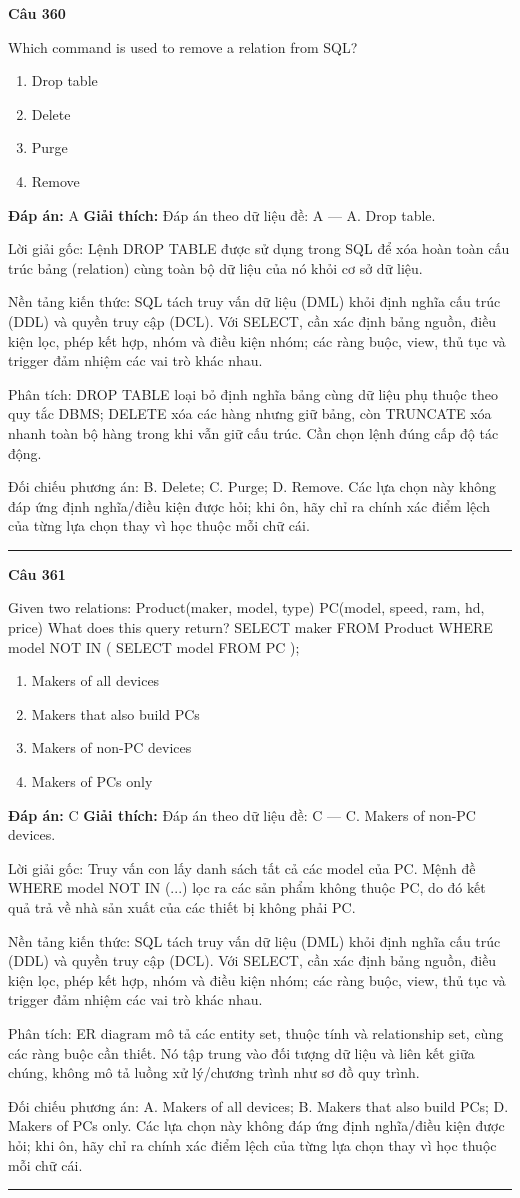 \documentclass[11pt,a4paper]{article}
\newenvironment{question}[1]{%
  \par\vspace{1em}\noindent\textbf{\large Câu #1}\par\vspace{0.4em}
}{%
  \par\vspace{1em}\hrule\vspace{0.6em}
}
\newenvironment{choices}{%
  \begin{enumerate}[label=\textbf{\Alph*.},leftmargin=2.2em,itemsep=2pt,topsep=3pt]
}{%
  \end{enumerate}
}
\newcommand{\choice}{\item}
\begin{document}
\begin{question}{360}
Which command is used to remove a relation from SQL?
\begin{choices}
\choice Drop table
\choice Delete
\choice Purge
\choice Remove
\end{choices}
\textbf{Đáp án:} A
\textbf{Giải thích:} Đáp án theo dữ liệu đề: A — A. Drop table.

Lời giải gốc: Lệnh DROP TABLE được sử dụng trong SQL để xóa hoàn toàn cấu trúc bảng (relation) cùng toàn bộ dữ liệu của nó khỏi cơ sở dữ liệu.

Nền tảng kiến thức: SQL tách truy vấn dữ liệu (DML) khỏi định nghĩa cấu trúc (DDL) và quyền truy cập (DCL). Với SELECT, cần xác định bảng nguồn, điều kiện lọc, phép kết hợp, nhóm và điều kiện nhóm; các ràng buộc, view, thủ tục và trigger đảm nhiệm các vai trò khác nhau.

Phân tích: DROP TABLE loại bỏ định nghĩa bảng cùng dữ liệu phụ thuộc theo quy tắc DBMS; DELETE xóa các hàng nhưng giữ bảng, còn TRUNCATE xóa nhanh toàn bộ hàng trong khi vẫn giữ cấu trúc. Cần chọn lệnh đúng cấp độ tác động.

Đối chiếu phương án: B. Delete; C. Purge; D. Remove. Các lựa chọn này không đáp ứng định nghĩa/điều kiện được hỏi; khi ôn, hãy chỉ ra chính xác điểm lệch của từng lựa chọn thay vì học thuộc mỗi chữ cái.
\end{question}

\begin{question}{361}
Given two relations: Product(maker, model, type) PC(model, speed, ram, hd, price) What does this query return? SELECT maker FROM Product WHERE model NOT IN ( SELECT model FROM PC );
\begin{choices}
\choice Makers of all devices
\choice Makers that also build PCs
\choice Makers of non-PC devices
\choice Makers of PCs only
\end{choices}
\textbf{Đáp án:} C
\textbf{Giải thích:} Đáp án theo dữ liệu đề: C — C. Makers of non-PC devices.

Lời giải gốc: Truy vấn con lấy danh sách tất cả các model của PC. Mệnh đề WHERE model NOT IN (...) lọc ra các sản phẩm không thuộc PC, do đó kết quả trả về nhà sản xuất của các thiết bị không phải PC.

Nền tảng kiến thức: SQL tách truy vấn dữ liệu (DML) khỏi định nghĩa cấu trúc (DDL) và quyền truy cập (DCL). Với SELECT, cần xác định bảng nguồn, điều kiện lọc, phép kết hợp, nhóm và điều kiện nhóm; các ràng buộc, view, thủ tục và trigger đảm nhiệm các vai trò khác nhau.

Phân tích: ER diagram mô tả các entity set, thuộc tính và relationship set, cùng các ràng buộc cần thiết. Nó tập trung vào đối tượng dữ liệu và liên kết giữa chúng, không mô tả luồng xử lý/chương trình như sơ đồ quy trình.

Đối chiếu phương án: A. Makers of all devices; B. Makers that also build PCs; D. Makers of PCs only. Các lựa chọn này không đáp ứng định nghĩa/điều kiện được hỏi; khi ôn, hãy chỉ ra chính xác điểm lệch của từng lựa chọn thay vì học thuộc mỗi chữ cái.
\end{question}
\end{document}
